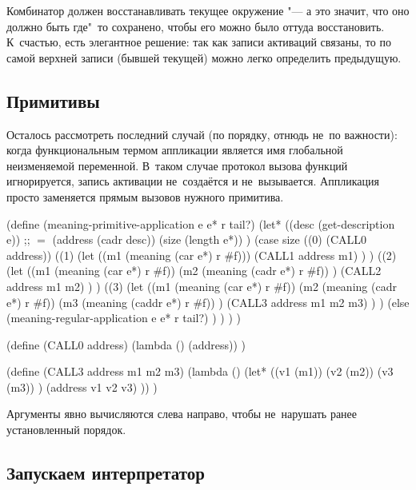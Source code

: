 Комбинатор  должен восстанавливать текущее окружение "--- а это
значит, что оно должно быть где"~то сохранено, чтобы его можно было оттуда
восстановить. К~счастью, есть элегантное решение: так как записи активаций
связаны, то по самой верхней записи (бывшей текущей) можно легко определить
предыдущую.


\subsection{Примитивы}\label{fast/dilute/ssect:primitives}

Осталось рассмотреть последний случай (по порядку, отнюдь не~по важности): когда
функциональным термом аппликации является имя глобальной неизменяемой
переменной. В~таком случае протокол вызова функций игнорируется, запись
активации не~создаётся и  не~вызывается. Аппликация просто заменяется
прямым вызовов нужного примитива.

\begin{code:lisp}
(define (meaning-primitive-application e e* r tail?)
  (let* ((desc (get-description e))
         ;; ${}={}$
         (address (cadr desc))
         (size (length e*)) )
    (case size
      ((0) (CALL0 address))
      ((1)
       (let ((m1 (meaning (car e*) r #f)))
         (CALL1 address m1) ) )
      ((2)
       (let ((m1 (meaning (car e*) r #f))
             (m2 (meaning (cadr e*) r #f)) )
        (CALL2 address m1 m2) ) )
      ((3)
       (let ((m1 (meaning (car e*) r #f))
             (m2 (meaning (cadr e*) r #f))
             (m3 (meaning (caddr e*) r #f)) )
        (CALL3 address m1 m2 m3) ) )
      (else
       (meaning-regular-application e e* r tail?) ) ) ) )

(define (CALL0 address)
  (lambda () (address)) )

(define (CALL3 address m1 m2 m3)
  (lambda () (let* ((v1 (m1))
                    (v2 (m2))
                    (v3 (m3)) )
               (address v1 v2 v3) )) )
\end{code:lisp}

Аргументы  явно вычисляются слева направо, чтобы не~нарушать ранее
установленный порядок.


\subsection{Запускаем интерпретатор}\label{fast/dilute/ssect:starting}

